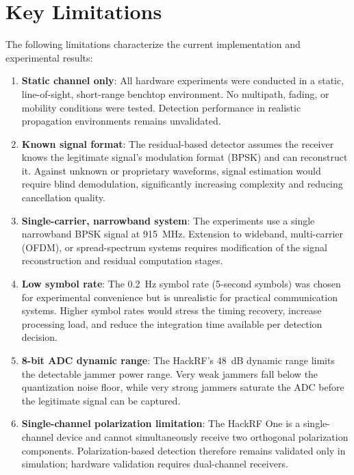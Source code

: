 \documentclass{article}
\begin{document}
\newpage
\section{Key Limitations}

The following limitations characterize the current implementation and experimental results:

\begin{enumerate}
\item \textbf{Static channel only}: All hardware experiments were conducted in a static, line-of-sight, short-range benchtop environment. No multipath, fading, or mobility conditions were tested. Detection performance in realistic propagation environments remains unvalidated.

\item \textbf{Known signal format}: The residual-based detector assumes the receiver knows the legitimate signal's modulation format (BPSK) and can reconstruct it. Against unknown or proprietary waveforms, signal estimation would require blind demodulation, significantly increasing complexity and reducing cancellation quality.

\item \textbf{Single-carrier, narrowband system}: The experiments use a single narrowband BPSK signal at 915~MHz. Extension to wideband, multi-carrier (OFDM), or spread-spectrum systems requires modification of the signal reconstruction and residual computation stages.

\item \textbf{Low symbol rate}: The 0.2~Hz symbol rate (5-second symbols) was chosen for experimental convenience but is unrealistic for practical communication systems. Higher symbol rates would stress the timing recovery, increase processing load, and reduce the integration time available per detection decision.

\item \textbf{8-bit ADC dynamic range}: The HackRF's 48~dB dynamic range limits the detectable jammer power range. Very weak jammers fall below the quantization noise floor, while very strong jammers saturate the ADC before the legitimate signal can be captured.

\item \textbf{Single-channel polarization limitation}: The HackRF One is a single-channel device and cannot simultaneously receive two orthogonal polarization components. Polarization-based detection therefore remains validated only in simulation; hardware validation requires dual-channel receivers.


\end{enumerate}
\end{document}
